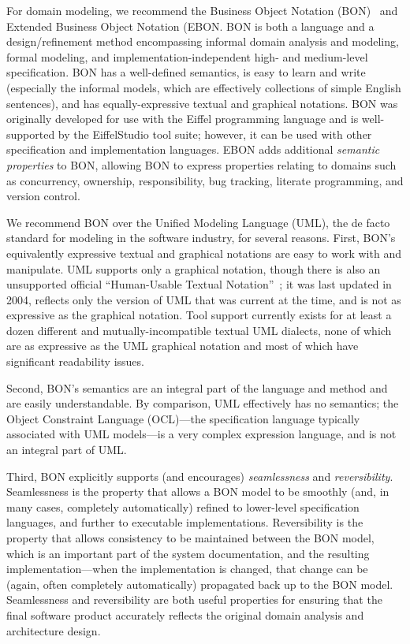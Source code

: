 For domain modeling, we recommend the Business Object Notation
(BON)~\cite{walden1995seamless} and Extended Business Object Notation
(EBON. BON is both a language and a design/refinement method
encompassing informal domain analysis and modeling, formal modeling,
and implementation-independent high- and medium-level
specification. BON has a well-defined semantics, is easy to learn and
write (especially the informal models, which are effectively
collections of simple English sentences), and has equally-expressive
textual and graphical notations. BON was originally developed for use
with the Eiffel programming language and is well-supported by the
EiffelStudio tool suite; however, it can be used with other
specification and implementation languages. EBON adds additional
\emph{semantic properties} to BON, allowing BON to express properties
relating to domains such as concurrency, ownership, responsibility,
bug tracking, literate programming, and version control.

We recommend BON over the Unified Modeling Language (UML), the de
facto standard for modeling in the software industry, for several
reasons. First, BON's equivalently expressive textual and graphical
notations are easy to work with and manipulate. UML supports only a
graphical notation, though there is also an unsupported official
``Human-Usable Textual Notation''~\cite{HUTN}; it was last updated in
2004, reflects only the version of UML that was current at the time,
and is not as expressive as the graphical notation. Tool support
currently exists for at least a dozen different and
mutually-incompatible textual UML dialects, none of which are as
expressive as the UML graphical notation and most of which have
significant readability issues.

Second, BON's semantics are an integral part of the language and
method and are easily understandable. By comparison, UML effectively
has no semantics; the Object Constraint Language (OCL)---the
specification language typically associated with UML models---is a
very complex expression language, and is not an integral part of UML.

Third, BON explicitly supports (and encourages) \emph{seamlessness}
and \emph{reversibility}. Seamlessness is the property that allows a
BON model to be smoothly (and, in many cases, completely
automatically) refined to lower-level specification languages, and
further to executable implementations. Reversibility is the property
that allows consistency to be maintained between the BON model, which
is an important part of the system documentation, and the resulting
implementation---when the implementation is changed, that change can
be (again, often completely automatically) propagated back up to the
BON model. Seamlessness and reversibility are both useful properties
for ensuring that the final software product accurately reflects the
original domain analysis and architecture design.

